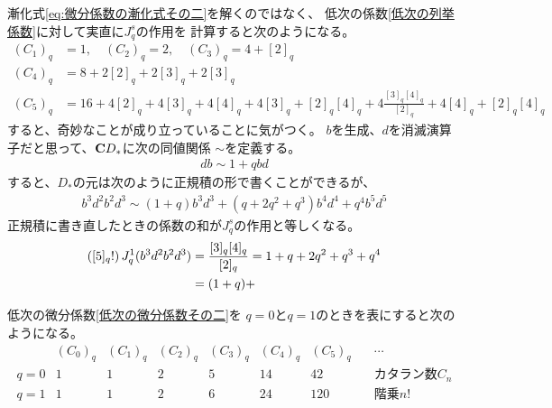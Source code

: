 {	漸化式\eqref{eq:微分係数の漸化式その二}を解くのではなく、
	低次の係数\eqref{低次の列挙係数}に対して実直に$J_q^s$の作用を
	計算すると次のようになる。
	\begin{equation}\label{低次の微分係数その二}\begin{split}
		(C_1)_q &= 1 ,\quad (C_2)_q = 2 ,\quad (C_3)_q = 4 + [2]_q \\
		(C_4)_q &= 8 + 2[2]_q + 2[3]_q + 2[3]_q \\
		(C_5)_q &= 16 + 4[2]_q + 4[3]_q + 4[4]_q + 4 [3]_q + [2]_q[4]_q 
			+ 4\frac{[3]_q[4]_q}{[2]_q} + 4[4]_q + [2]_q[4]_q
	\end{split}\end{equation}
	すると、奇妙なことが成り立っていることに気がつく。
	$b$を生成、$d$を消滅演算子だと思って、$\mathbf{C} D_*$に次の同値関係
	$\sim$を定義する。
	\begin{equation*}\begin{split}
		db \sim 1 + qbd
	\end{split}\end{equation*}
	すると、$D_*$の元は次のように正規積の形で書くことができるが、
	\begin{equation*}\begin{split}
		b^3d^2b^2d^3 \sim (1 + q)b^3d^3 + (q + 2q^2 + q^3)b^4d^4 + q^4 b^5d^5
	\end{split}\end{equation*}
	正規積に書き直したときの係数の和が$J_q^s$の作用と等しくなる。
	\begin{equation*}\begin{split}
		\mathinner{\left({[5]_q!}\right)}J_q^1(b^3d^2b^2d^3) &= \frac{[3]_q[4]_q}{[2]_q}
			= 1 + q + 2q^2 + q^3 + q^4 \\
		&= (1 + q) + 
	\end{split}\end{equation*}

	\begin{note}[プログラムの確認]\label{note:プログラムの確認} %
		低次の微分係数\eqref{低次の微分係数その二}を
		$q=0$と$q=1$のときを表にすると次のようになる。
		\begin{equation*}\begin{array}{r|rrrrrrl}
			& (C_0)_q & (C_1)_q & (C_2)_q & (C_3)_q & (C_4)_q & (C_5)_q 
				& \quad\cdots \\\hline
			q=0 & 1 & 1 & 2 & 5 & 14 & 42 & \quad\text{カタラン数}C_n \\
			q=1 & 1 & 1 & 2 & 6 & 24 & 120 & \quad\text{階乗}n! \\
		\end{array}\end{equation*}
	\end{note} %
}
